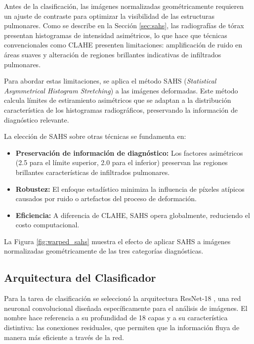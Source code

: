 Antes de la clasificación, las imágenes normalizadas geométricamente requieren un ajuste de contraste para optimizar la visibilidad de las estructuras pulmonares. Como se describe en la Sección \ref{sec:sahs}, las radiografías de tórax presentan histogramas de intensidad asimétricos, lo que hace que técnicas convencionales como CLAHE presenten limitaciones: amplificación de ruido en áreas suaves y alteración de regiones brillantes indicativas de infiltrados pulmonares.

Para abordar estas limitaciones, se aplica el método SAHS (\textit{Statistical Asymmetrical Histogram Stretching}) \cite{cruz2025sahs} a las imágenes deformadas. Este método calcula límites de estiramiento asimétricos que se adaptan a la distribución característica de los histogramas radiográficos, preservando la información de diagnóstico relevante.

La elección de SAHS sobre otras técnicas se fundamenta en:

\begin{itemize}
    \item \textbf{Preservación de información de diagnóstico:} Los factores asimétricos (2.5 para el límite superior, 2.0 para el inferior) preservan las regiones brillantes características de infiltrados pulmonares.

    \item \textbf{Robustez:} El enfoque estadístico minimiza la influencia de píxeles atípicos causados por ruido o artefactos del proceso de deformación.

    \item \textbf{Eficiencia:} A diferencia de CLAHE, SAHS opera globalmente, reduciendo el costo computacional.
\end{itemize}

La Figura \ref{fig:warped_sahs} muestra el efecto de aplicar SAHS a imágenes normalizadas geométricamente de las tres categorías diagnósticas.

\subsection{Arquitectura del Clasificador}
\label{subsec:arquitectura_clasificador}

Para la tarea de clasificación se seleccionó la arquitectura ResNet-18 \cite{he2016deep}, una red neuronal convolucional diseñada específicamente para el análisis de imágenes. El nombre hace referencia a su profundidad de 18 capas y a su característica distintiva: las conexiones residuales, que permiten que la información fluya de manera más eficiente a través de la red.


